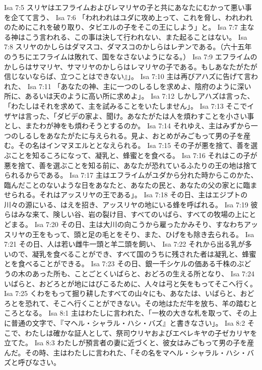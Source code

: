 Isa 7:5  スリヤはエフライムおよびレマリヤの子と共にあなたにむかって悪い事を企てて言う、
Isa 7:6  「われわれはユダに攻め上って、これを脅し、われわれのためにこれを破り取り、タビエルの子をそこの王にしよう」と。
Isa 7:7  主なる神はこう言われる、この事は決して行われない、また起ることはない。
Isa 7:8  スリヤのかしらはダマスコ、ダマスコのかしらはレヂンである。（六十五年のうちにエフライムは敗れて、国をなさないようになる。）
Isa 7:9  エフライムのかしらはサマリヤ、サマリヤのかしらはレマリヤの子である。もしあなたがたが信じないならば、立つことはできない』」。
Isa 7:10  主は再びアハズに告げて言われた、
Isa 7:11  「あなたの神、主に一つのしるしを求めよ、陰府のように深い所に、あるいは天のように高い所に求めよ」。
Isa 7:12  しかしアハズは言った、「わたしはそれを求めて、主を試みることをいたしません」。
Isa 7:13  そこでイザヤは言った、「ダビデの家よ、聞け。あなたがたは人を煩わすことを小さい事とし、またわが神をも煩わそうとするのか。
Isa 7:14  それゆえ、主はみずから一つのしるしをあなたがたに与えられる。見よ、おとめがみごもって男の子を産む。その名はインマヌエルととなえられる。
Isa 7:15  その子が悪を捨て、善を選ぶことを知るころになって、凝乳と、蜂蜜とを食べる。
Isa 7:16  それはこの子が悪を捨て、善を選ぶことを知る前に、あなたが恐れているふたりの王の地は捨てられるからである。
Isa 7:17  主はエフライムがユダから分れた時からこのかた、臨んだことのないような日をあなたと、あなたの民と、あなたの父の家とに臨ませられる。それはアッスリヤの王である」。
Isa 7:18  その日、主はエジプトの川々の源にいる、はえを招き、アッスリヤの地にいる蜂を呼ばれる。
Isa 7:19  彼らはみな来て、険しい谷、岩の裂け目、すべてのいばら、すべての牧場の上にとどまる。
Isa 7:20  その日、主は大川の向こうから雇ったかみそり、すなわちアッスリヤの王をもって、頭と足の毛とをそり、また、ひげをも除き去られる。
Isa 7:21  その日、人は若い雌牛一頭と羊二頭を飼い、
Isa 7:22  それから出る乳が多いので、凝乳を食べることができ、すべて国のうちに残された者は凝乳と、蜂蜜とを食べることができる。
Isa 7:23  その日、銀一千シケルの価ある千株のぶどうの木のあった所も、ことごとくいばらと、おどろの生える所となり、
Isa 7:24  いばらと、おどろとが地にはびこるために、人々は弓と矢をもってそこへ行く。
Isa 7:25  くわをもって掘り耕したすべての山々にも、あなたは、いばらと、おどろとを恐れて、そこへ行くことができない。その地はただ牛を放ち、羊の踏むところとなる。
Isa 8:1  主はわたしに言われた、「一枚の大きな札を取って、その上に普通の文字で、『マヘル・シャラル・ハシ・バズ』と書きなさい」。
Isa 8:2  そこで、わたしは確かな証人として、祭司ウリヤおよびエベレキヤの子ゼカリヤを立てた。
Isa 8:3  わたしが預言者の妻に近づくと、彼女はみごもって男の子を産んだ。その時、主はわたしに言われた、「その名をマヘル・シャラル・ハシ・バズと呼びなさい。
